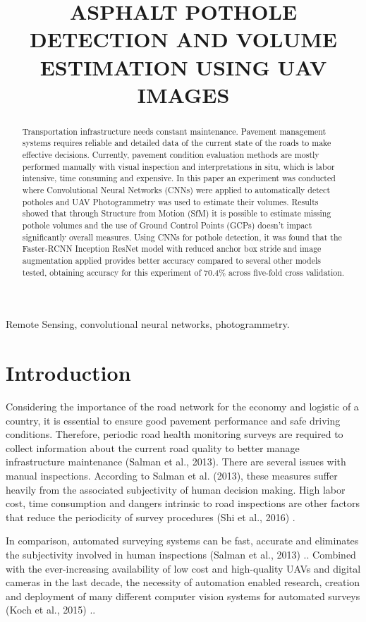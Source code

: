 \documentclass{article}
\title{ASPHALT POTHOLE DETECTION AND VOLUME ESTIMATION USING UAV IMAGES}
\begin{document}
%
\maketitle
%
\begin{abstract}
Transportation infrastructure needs constant maintenance. Pavement management systems requires reliable and detailed data of the current state of the roads to make effective decisions. Currently, pavement condition evaluation methods are mostly performed manually with visual inspection and interpretations in situ, which is labor intensive, time consuming and expensive. In this paper an experiment was conducted where Convolutional Neural Networks (CNNs) were applied to automatically detect potholes and UAV Photogrammetry was used to estimate their volumes. Results showed that through Structure from Motion (SfM) it is possible to estimate missing pothole volumes and the use of Ground Control Points (GCPs) doesn’t impact significantly overall measures. Using CNNs for pothole detection, it was found that the Faster-RCNN Inception ResNet model with reduced anchor box stride and image augmentation applied provides better accuracy compared to several other models tested, obtaining accuracy for this experiment of 70.4\% across five-fold cross validation.


\end{abstract}
%
\begin{keywords}
Remote Sensing, convolutional neural networks, photogrammetry.
\end{keywords}
%
\section{Introduction}
\label{sec:intro}

Considering the importance of the road network for the economy and logistic of a country, it is essential to ensure good pavement performance and safe driving conditions. Therefore, periodic road health monitoring surveys are required to collect information about the current road quality to better manage infrastructure maintenance (Salman et al., 2013). There are several issues with manual inspections. According to Salman et al. (2013), these measures suffer heavily from the associated subjectivity of human decision making. High labor cost, time consumption and dangers intrinsic to road inspections are other factors that reduce the periodicity of survey procedures (Shi et al., 2016) \cite{C2} \cite{Lamp86}.

In comparison, automated surveying systems can be fast, accurate and eliminates the subjectivity involved in human inspections (Salman et al., 2013) \cite{C2}.. Combined with the ever-increasing availability of low cost and high-quality UAVs and digital cameras in the last decade, the necessity of automation enabled research, creation and deployment of many different computer vision systems for automated surveys (Koch et al., 2015) \cite{C2}..
\end{document}
